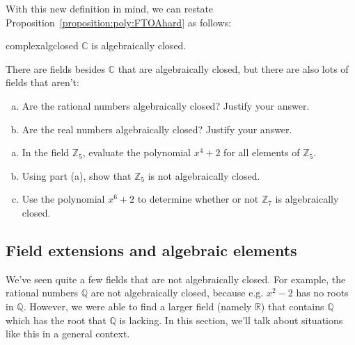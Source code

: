 With this new definition in mind, we can restate Proposition~\ref{proposition:poly:FTOAhard} as follows: 

\begin{prop}{complexalgclosed}
$\mathbb{C}$ is algebraically closed.
\end{prop}

There are fields  besides $\mathbb{C}$ that are algebraically closed,  but there are  also  lots of fields that aren't:

\begin{exercise}{}
\begin {enumerate}[(a)]
\item
Are the rational numbers algebraically closed? Justify your answer.
\item
Are the real numbers algebraically closed? Justify your answer.
\end{enumerate}
\end{exercise}


\begin{exercise}{}
\begin{enumerate}[(a)]
\item
In the field $\mathbb{Z}_5$, evaluate the polynomial $x^4+2$  for all elements of  $\mathbb{Z}_5$.
\item
Using part (a), show  that $\mathbb{Z}_5$ is not algebraically closed.
\item
Use the polynomial $x^6 + 2$ to determine whether or not $\mathbb{Z}_7$ is algebraically closed.
\end{enumerate}
\end{exercise}

\subsection{Field extensions and algebraic elements}
We've seen quite a few fields that are not algebraically closed. For example, the rational numbers $\mathbb{Q}$ are not algebraically closed, because e.g. $x^2 - 2$ has no  roots in $\mathbb{Q}$.  However, we were able to find a larger field (namely $\mathbb{R}$) that contains $\mathbb{Q}$ which has the root that $\mathbb{Q}$ is lacking. In this section, we'll talk about situations like this in a general context. 


